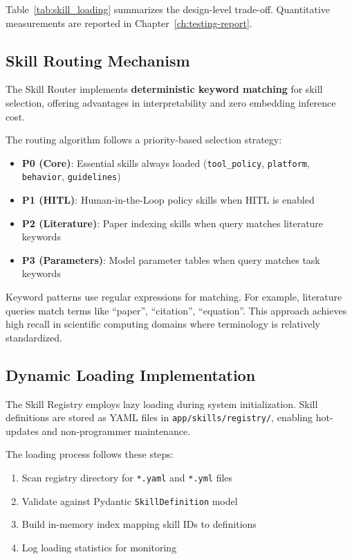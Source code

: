Table~\ref{tab:skill_loading} summarizes the design-level trade-off. Quantitative measurements are reported in Chapter~\ref{ch:testing-report}.

\subsection{Skill Routing Mechanism}

The Skill Router implements \textbf{deterministic keyword matching} for skill selection, offering advantages in interpretability and zero embedding inference cost.

The routing algorithm follows a priority-based selection strategy:

\begin{itemize}
	\item \textbf{P0 (Core)}: Essential skills always loaded (\texttt{tool\_policy}, \texttt{platform}, \texttt{behavior}, \texttt{guidelines})
	\item \textbf{P1 (HITL)}: Human-in-the-Loop policy skills when HITL is enabled
	\item \textbf{P2 (Literature)}: Paper indexing skills when query matches literature keywords
	\item \textbf{P3 (Parameters)}: Model parameter tables when query matches task keywords
\end{itemize}

Keyword patterns use regular expressions for matching. For example, literature queries match terms like ``paper'', ``citation'', ``equation''. This approach achieves high recall in scientific computing domains where terminology is relatively standardized.

\subsection{Dynamic Loading Implementation}

The Skill Registry employs lazy loading during system initialization. Skill definitions are stored as YAML files in \texttt{app/skills/registry/}, enabling hot-updates and non-programmer maintenance.

The loading process follows these steps:
\begin{enumerate}
	\item Scan registry directory for \texttt{*.yaml} and \texttt{*.yml} files
	\item Validate against Pydantic \texttt{SkillDefinition} model
	\item Build in-memory index mapping skill IDs to definitions
	\item Log loading statistics for monitoring
\end{enumerate}

